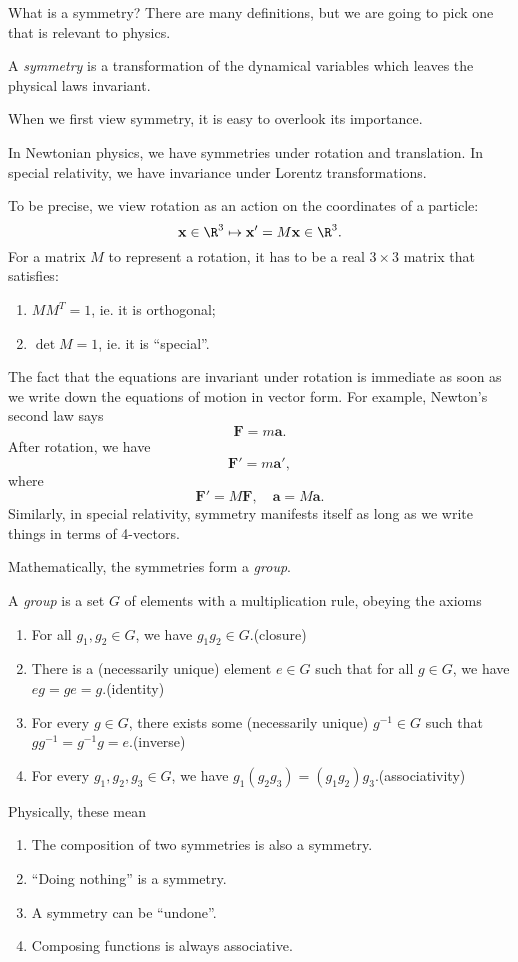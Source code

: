\documentclass[a4paper]{article}
\begin{document}
What is a symmetry? There are many definitions, but we are going to pick one that is relevant to physics.
\begin{defi}[Symmetry]
  A \emph{symmetry} is a transformation of the dynamical variables which leaves the physical laws invariant.
\end{defi}

When we first view symmetry, it is easy to overlook its importance.
\begin{eg}
  In Newtonian physics, we have symmetries under rotation and translation. In special relativity, we have invariance under Lorentz transformations.

  To be precise, we view rotation as an action on the coordinates of a particle:
  \[
    \mathbf{x} \in \R^3 \mapsto \mathbf{x}' = M \mathbf{x} \in \R^3.
  \]
  For a matrix $M$ to represent a rotation, it has to be a real $3 \times 3$ matrix that satisfies:
  \begin{enumerate}
    \item $MM^T = 1$, ie. it is orthogonal;
    \item $\det M = 1$, ie. it is ``special''.
  \end{enumerate}
  The fact that the equations are invariant under rotation is immediate as soon as we write down the equations of motion in vector form. For example, Newton's second law says
  \[
    \mathbf{F} = m \mathbf{a}.
  \]
  After rotation, we have
  \[
    \mathbf{F}' = m \mathbf{a}',
  \]
  where
  \[
    \mathbf{F}' = M \mathbf{F},\quad \mathbf{a} = M\mathbf{a}.
  \]
  Similarly, in special relativity, symmetry manifests itself as long as we write things in terms of 4-vectors.
\end{eg}

Mathematically, the symmetries form a \emph{group}.
\begin{defi}[Group]
  A \emph{group} is a set $G$ of elements with a multiplication rule, obeying the axioms
  \begin{enumerate}
    \item For all $g_1, g_2 \in G$, we have $g_1 g_2 \in G$.\hfill (closure)
    \item There is a (necessarily unique) element $e \in G$ such that for all $g \in G$, we have $eg = ge = g$.\hfill (identity)
    \item For every $g \in G$, there exists some (necessarily unique) $g^{-1} \in G$ such that $gg^{-1} = g^{-1}g = e$.\hfill (inverse)
    \item For every $g_1, g_2, g_3 \in G$, we have $g_1 (g_2 g_3) = (g_1 g_2) g_3$.\hfill (associativity)
  \end{enumerate}
\end{defi}
Physically, these mean
\begin{enumerate}
  \item The composition of two symmetries is also a symmetry.
  \item ``Doing nothing'' is a symmetry.
  \item A symmetry can be ``undone''.
  \item Composing functions is always associative.
\end{enumerate}
\end{document}
